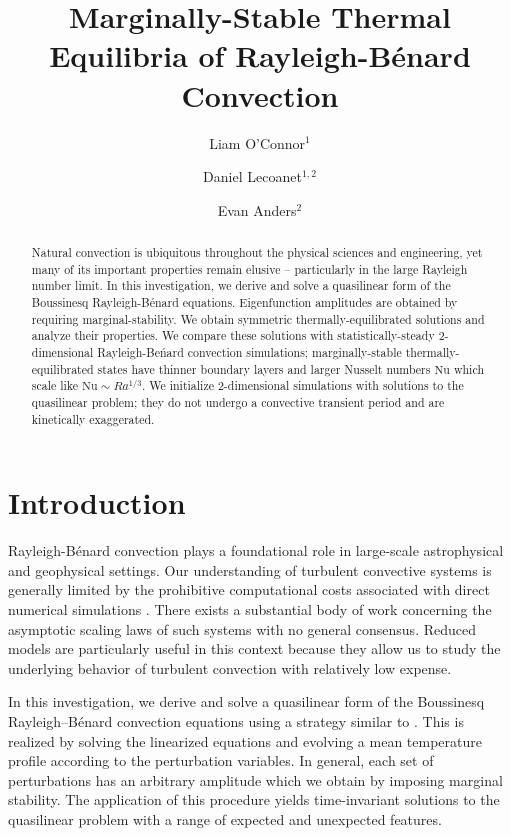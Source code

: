 \documentclass[reprint,amsmath,amssymb,aps]{revtex4-1}
\newcommand\Nu{\mathrm{Nu}}
\begin{document}
\title{Marginally-Stable Thermal Equilibria of Rayleigh-Bénard Convection}

\author{Liam O'Connor$^1$}
\author{Daniel Lecoanet$^{1, 2}$}
\author{Evan Anders$^2$}

\begin{abstract}
Natural convection is ubiquitous throughout the physical sciences and engineering, yet many of its important properties remain elusive -- particularly in the large Rayleigh number limit.
In this investigation, we derive and solve a quasilinear form of the Boussinesq Rayleigh-B\'enard equations. 
Eigenfunction amplitudes are obtained by requiring marginal-stability. We obtain symmetric thermally-equilibrated solutions and analyze their properties. 
We compare these solutions with statistically-steady 2-dimensional Rayleigh-Be\'nard convection simulations; marginally-stable thermally-equilibrated states have thinner boundary layers and larger Nusselt numbers $\Nu$ which scale like $\Nu \sim Ra^{1/3}$. 
We initialize 2-dimensional simulations with solutions to the quasilinear problem; they do not undergo a convective transient period and are kinetically exaggerated.
\end{abstract}


\maketitle

\section{Introduction}
Rayleigh-B\'enard convection plays a foundational role in large-scale astrophysical and geophysical settings. 
Our understanding of turbulent convective systems is generally limited by the prohibitive computational costs associated with direct numerical simulations \cite{Zhu}. 
There exists a substantial body of work concerning the asymptotic scaling laws of such systems with no general consensus. 
Reduced models are particularly useful in this context because they allow us to study the underlying behavior of turbulent convection with relatively low expense. 

In this investigation, we derive and solve a quasilinear form of the Boussinesq Rayleigh–Bénard convection equations using a strategy similar to \cite{Chini_sw}. 
This is realized by solving the linearized equations and evolving a mean temperature profile according to the perturbation variables. 
In general, each set of perturbations has an arbitrary amplitude which we obtain by imposing marginal stability. 
The application of this procedure yields time-invariant solutions to the quasilinear problem with a range of expected and unexpected features. 
\end{document}

